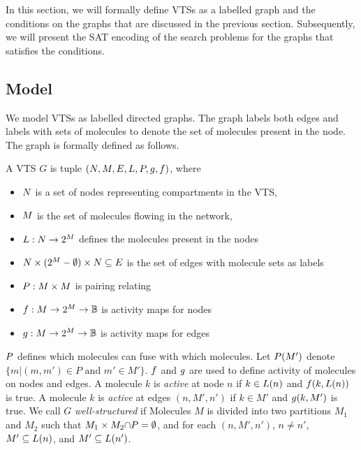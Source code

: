 In this section, we will formally define VTSs as a labelled graph
and the conditions on the graphs that are discussed in the previous
section.
%
Subsequently, we will present the SAT encoding of the search problems
for the graphs that satisfies the conditions.

\subsection{Model}

We model VTSs as labelled directed graphs.
The graph labels both edges and labels with sets of molecules to denote
the set of molecules present in the node.
The graph is formally defined as follows.

\begin{df}
  A VTS $G$ is tuple $(N,M,E,L,P,g,f)$, where
  \begin{itemize}
  \item $N$ is a set of nodes representing compartments in the VTS,
  \item $M$ is the set of molecules flowing in the network, 
  \item $L : N \rightarrow 2^{M}$ defines the molecules present in the nodes  
  \item $ N \times (2^{M}-\emptyset) \times N \subseteq E$ is the set of edges
    with molecule sets as labels
  \item $P : M \times M$ is pairing relating
  \item $f : M \rightarrow 2^{M} \rightarrow \mathbb{B}$ is activity maps for nodes
  \item $g : M \rightarrow 2^{M} \rightarrow \mathbb{B} $ is activity maps for edges
  \end{itemize}
\end{df}
$P$ defines which molecules can fuse with which molecules.
%
Let $P(M')$ denote $\{m|(m,m') \in P \text{ and } m' \in M'\}$.
%
$f$ and $g$ are used to define activity of molecules on
nodes and edges.
%
A molecule $k$ is {\em active} at node $n$ if $k \in L(n)$ and
$f(k,L(n))$ is true.
%
A molecule $k$ is {\em active} at edges $(n,M',n')$ if $k \in M'$ and
$g(k,M')$ is true.
%
We call $G$ {\em well-structured} if 
Molecules $M$ is divided into two partitions $M_1$ and $M_2$
such that $M_1 \times M_2 {\cap} P = \emptyset$, and
for each $(n,M',n')$, $n \neq n'$, 
$M' \subseteq L(n)$, and $M' \subseteq L(n')$.
%

